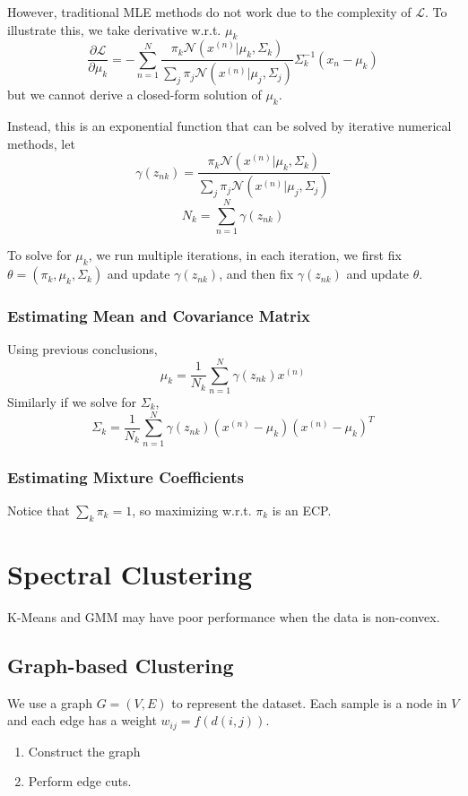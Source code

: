         However, traditional MLE methods do not work due to the complexity of $\mathcal{L}$. To illustrate this, we take derivative w.r.t. $\mu_k$
        \[ \frac{\partial \mathcal{L}}{\partial \mu_k} = -\sum_{n=1}^N\frac{\pi_k\mathcal{N}(x^{(n)}|\mu_k,\Sigma_k)}{\sum_j\pi_j\mathcal{N}(x^{(n)}|\mu_j,\Sigma_j)}\Sigma_k^{-1}(x_n-\mu_k) \]
        but we cannot derive a closed-form solution of $\mu_k$.

        Instead, this is an exponential function that can be solved by iterative numerical methods, let
        \[ \gamma(z_{nk}) = \frac{\pi_k\mathcal{N}(x^{(n)}|\mu_k,\Sigma_k)}{\sum_j\pi_j\mathcal{N}(x^{(n)}|\mu_j,\Sigma_j)} \]
        \[ N_k = \sum_{n=1}^N \gamma(z_{nk}) \]

        To solve for $\mu_k$, we run multiple iterations, in each iteration, we first fix $\theta = (\pi_k,\mu_k,\Sigma_k)$ and update $\gamma(z_{nk})$, and then fix $\gamma(z_{nk})$ and update $\theta$.

        \subsubsection{Estimating Mean and Covariance Matrix}
        Using previous conclusions,
        \[ \mu_k = \frac{1}{N_k}\sum_{n=1}^N\gamma(z_{nk})x^{(n)} \]
        Similarly if we solve for $\Sigma_k$,
        \[ \Sigma_k = \frac{1}{N_k}\sum_{n=1}^N\gamma(z_{nk})(x^{(n)}-\mu_k)(x^{(n)}-\mu_k)^T \]

        \subsubsection{Estimating Mixture Coefficients}
        Notice that $\sum_k\pi_k = 1$, so maximizing w.r.t. $\pi_k$ is an ECP.

    
\section{Spectral Clustering}
    K-Means and GMM may have poor performance when the data is non-convex.
    
    \subsection{Graph-based Clustering}
        We use a graph $G=(V,E)$ to represent the dataset. Each sample is a node in $V$ and each edge has a weight $w_{ij}=f(d(i,j))$.

        \begin{enumerate}
            \item Construct the graph
            \item Perform edge cuts.
        \end{enumerate}

